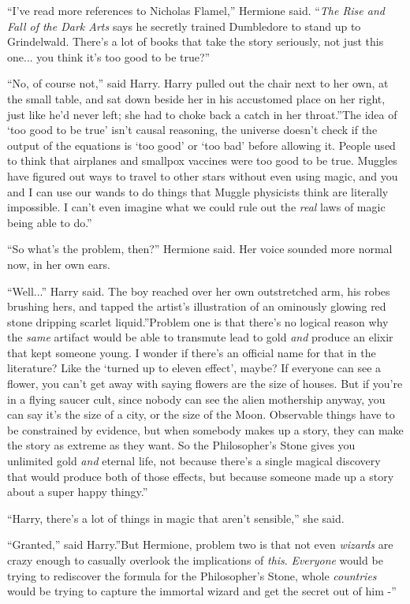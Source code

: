 ``I've read more references to Nicholas Flamel,'' Hermione said.
``\emph{The Rise and Fall of the Dark Arts} says he secretly trained
Dumbledore to stand up to Grindelwald. There's a lot of books that take
the story seriously, not just this one... you think it's too good
to be true?''

``No, of course not,'' said Harry. Harry pulled out the chair next to
her own, at the small table, and sat down beside her in his accustomed
place on her right, just like he'd never left; she had to choke back a
catch in her throat.''The idea of `too good to be true' isn't causal
reasoning, the universe doesn't check if the output of the equations is
`too good' or `too bad' before allowing it. People used to think that
airplanes and smallpox vaccines were too good to be true. Muggles have
figured out ways to travel to other stars without even using magic, and
you and I can use our wands to do things that Muggle physicists think
are literally impossible. I can't even imagine what we could rule out
the \emph{real} laws of magic being able to do.''

``So what's the problem, then?'' Hermione said. Her voice sounded more
normal now, in her own ears.

``Well...'' Harry said. The boy reached over her own outstretched
arm, his robes brushing hers, and tapped the artist's illustration of an
ominously glowing red stone dripping scarlet liquid.''Problem one is
that there's no logical reason why the \emph{same} artifact would be
able to transmute lead to gold \emph{and} produce an elixir that kept
someone young. I wonder if there's an official name for that in the
literature? Like the `turned up to eleven effect', maybe? If everyone
can see a flower, you can't get away with saying flowers are the size of
houses. But if you're in a flying saucer cult, since nobody can see the
alien mothership anyway, you can say it's the size of a city, or the
size of the Moon. Observable things have to be constrained by evidence,
but when somebody makes up a story, they can make the story as extreme
as they want. So the Philosopher's Stone gives you unlimited gold
\emph{and} eternal life, not because there's a single magical discovery
that would produce both of those effects, but because someone made up a
story about a super happy thingy.''

``Harry, there's a lot of things in magic that aren't sensible,'' she
said.

``Granted,'' said Harry.''But Hermione, problem two is that not even
\emph{wizards} are crazy enough to casually overlook the implications of
\emph{this}. \emph{Everyone} would be trying to rediscover the formula
for the Philosopher's Stone, whole \emph{countries} would be trying to
capture the immortal wizard and get the secret out of him -''

